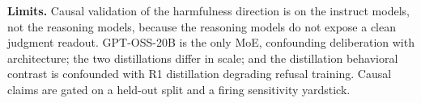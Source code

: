 \textbf{Limits.} Causal validation of the harmfulness direction is on the instruct models,
not the reasoning models, because the reasoning models do not expose a clean judgment
readout. GPT-OSS-20B is the only MoE, confounding deliberation with architecture; the
two distillations differ in scale; and the distillation behavioral contrast is
confounded with R1 distillation degrading refusal training. Causal claims are gated on
a held-out split and a firing sensitivity yardstick.
